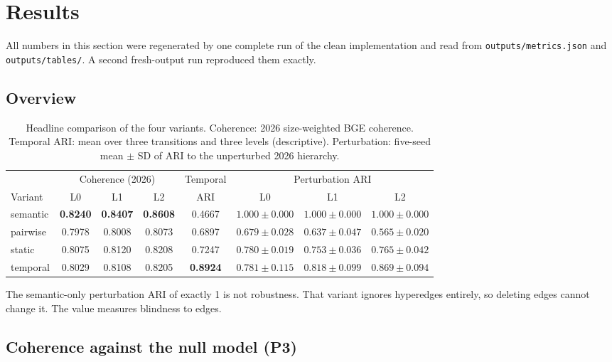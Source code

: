 \documentclass[11pt,a4paper]{article}
\theoremstyle{remark}
\newcommand{\code}[1]{\texttt{\small #1}}
\begin{document}
\section{Results}
\label{sec:results}

All numbers in this section were regenerated by one complete run of the clean
implementation and read from \code{outputs/metrics.json} and \code{outputs/tables/}. A
second fresh-output run reproduced them exactly.

\subsection{Overview}

\begin{table}[!htbp]
\centering
\caption{Headline comparison of the four variants. Coherence: 2026 size-weighted BGE
coherence. Temporal ARI: mean over three transitions and three levels (descriptive).
Perturbation: five-seed mean $\pm$ SD of ARI to the unperturbed 2026 hierarchy.}
\label{tab:headline}
\small
\begin{tabular}{lccccccc}
\toprule
& \multicolumn{3}{c}{Coherence (2026)} & Temporal & \multicolumn{3}{c}{Perturbation ARI}\\
\cmidrule(lr){2-4}\cmidrule(lr){6-8}
Variant & L0 & L1 & L2 & ARI & L0 & L1 & L2\\
\midrule
semantic & \textbf{0.8240} & \textbf{0.8407} & \textbf{0.8608} & 0.4667 & $1.000\pm0.000$ & $1.000\pm0.000$ & $1.000\pm0.000$\\
pairwise & 0.7978 & 0.8008 & 0.8073 & 0.6897 & $0.679\pm0.028$ & $0.637\pm0.047$ & $0.565\pm0.020$\\
static   & 0.8075 & 0.8120 & 0.8208 & 0.7247 & $0.780\pm0.019$ & $0.753\pm0.036$ & $0.765\pm0.042$\\
temporal & 0.8029 & 0.8108 & 0.8205 & \textbf{0.8924} & $0.781\pm0.115$ & $0.818\pm0.099$ & $0.869\pm0.094$\\
\bottomrule
\end{tabular}
\end{table}

The semantic-only perturbation ARI of exactly 1 is not robustness. That variant ignores
hyperedges entirely, so deleting edges cannot change it. The value measures blindness to
edges.

\subsection{Coherence against the null model (P3)}
\end{document}
